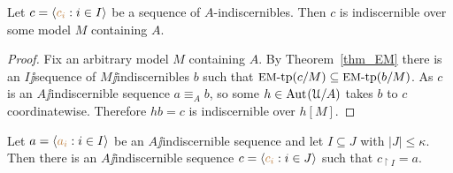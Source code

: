 \documentclass[creche.tex]{subfiles}
\begin{document}
\begin{proposition}\label{prop_indiscernibles_set_model}
  Let $c=\langle{\color{brown}c_i}:i\in I\rangle$ be a sequence of $A$-indiscernibles. Then $c$ is indiscernible over some model $M$ containing $A$.
\end{proposition}

\begin{proof}
  Fix an arbitrary model $M$ containing $A$. By Theorem~\ref{thm_EM} there is an $I\jj$sequence of $M\jj$indiscernibles $b$ such that $\textrm{{\small EM}\mbox{-}tp}(c/M)\subseteq\textrm{{\small EM}\mbox{-}tp}(b/M)$. As $c$ is an $A\jj$indiscernible sequence $a\equiv_Ab$, so some $h\in\textrm{Aut\kern.15ex}(\EuScript U/A)$ takes $b$ to $c$ coordinatewise. Therefore $hb=c$ is indiscernible over $h[M]$.
\end{proof}

\begin{exercise}
Let $a=\langle{\color{brown}a_i}:i\in I\rangle$ be an $A\jj$indiscernible sequence and let $I\subseteq J$ with $|J|\le \kappa$. Then there is an $A\jj$indiscernible sequence $c=\langle{\color{brown}c_i}:i\in J\rangle$ such that $c_{\restriction I}=a$.\QED
\end{exercise}
\end{document}

